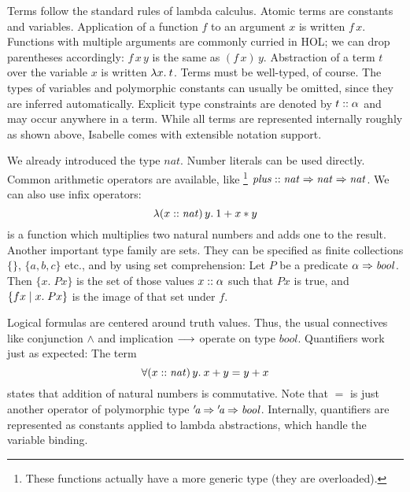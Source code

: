 Terms follow the standard rules of lambda calculus.
Atomic terms are constants and variables.
Application of a function $f$ to an argument $x$ is written $f\,x$.
Functions with multiple arguments are commonly curried in HOL;
we can drop parentheses accordingly: $f\,x\,y$ is the same as $(f\,x)\,y$.
Abstraction of a term $t$ over the variable $x$ is written $\lambda x.\>t$.
Terms must be well-typed, of course.
The types of variables and polymorphic constants can usually be omitted, since
they are inferred automatically.
Explicit type constraints are denoted by $t \mathrel{::} \alpha$ and may occur
anywhere in a term.
While all terms are represented internally roughly as shown above, Isabelle
comes with extensible notation support.

\begin{example}\label{exmp:hol-terms}
We already introduced the type $\mathit{nat}$.
Number literals can be used directly.
Common arithmetic operators are available, like%
\footnote{These functions actually have a more generic type (they are
overloaded).}
$\mathit{plus} \mathrel{::} \mathit{nat} \Rightarrow \mathit{nat} \Rightarrow \mathit{nat}$.
We can also use infix operators:
\[ \lambda (x \mathrel{::} \mathit{nat})\,y.\>1 + x * y \]
is a function which multiplies two natural numbers and adds one to the result.
Another important type family are sets.
They can be specified as finite collections $\{\}$, $\{a, b, c\}$ etc., and
by using set comprehension:
Let $P$ be a predicate $\alpha \Rightarrow \mathit{bool}$.
Then $\{x.\; P x\}$ is the set of those values $x \mathrel{::} \alpha$ such that
$P x$ is true, and $\{f x\mid x.\; P x\}$ is the image of that set under $f$.

Logical formulas are centered around truth values.
Thus, the usual connectives like conjunction $\land$ and implication $\longrightarrow$
operate on type $\mathit{bool}$.
Quantifiers work just as expected: The term
\[ \forall (x \mathrel{::} \mathit{nat})\,y.\>x + y = y + x \]
states that addition of natural numbers is commutative.
Note that $=$ is just another operator of polymorphic type
${'\!\textit{a}} \Rightarrow {'\!\textit{a}} \Rightarrow \mathit{bool}$.
Internally, quantifiers are represented as constants applied to lambda
abstractions, which handle the variable binding.
\end{example}

